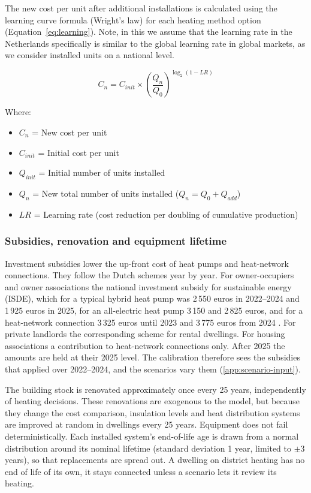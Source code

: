 \documentclass[preprint,12pt,authoryear]{elsarticle}
\begin{document}
The new cost per unit after additional installations is calculated using the
learning curve formula (Wright's law) for each heating method option
(Equation~\ref{eq:learning}). Note, in this we assume that the learning rate
in the Netherlands specifically is similar to the global learning rate in
global markets, as we consider installed units on a national level.

\begin{equation}\label{eq:learning}
  C_n = C_{init}\times \left(\frac{Q_n}{Q_0}\right)^{\log_2(1 - LR)}
\end{equation}

Where:
\begin{itemize}
  \item $C_n$ = New cost per unit
  \item $C_{init}$ = Initial cost per unit
  \item $Q_{init}$ = Initial number of units installed
  \item $Q_n$ = New total number of units installed ($Q_n = Q_0 + Q_{add}$)
  \item $LR$ = Learning rate (cost reduction per doubling of cumulative
  production)
\end{itemize}


\subsubsection{Subsidies, renovation and equipment lifetime}

Investment subsidies lower the up-front cost of heat pumps and heat-network
connections. They follow the Dutch schemes year by year. For owner-occupiers
and owner associations the national investment subsidy for sustainable energy
(ISDE), which for a typical hybrid heat pump was 2\,550 euros in 2022--2024
and 1\,925 euros in 2025, for an all-electric heat pump 3\,150 and 2\,825
euros, and for a heat-network connection 3\,325 euros until 2023 and 3\,775
euros from 2024 \citep{rvoISDE2025}. For private landlords the corresponding
scheme for rental dwellings. For housing associations a contribution to
heat-network connections only. After 2025 the amounts are held at their 2025
level. The calibration therefore sees the subsidies that applied over
2022--2024, and the scenarios vary them (\ref{app:scenario-input}).

The building stock is renovated approximately once every 25 years,
independently of heating decisions. These renovations are exogenous to the
model, but because they change the cost comparison, insulation levels and
heat distribution systems are improved at random in dwellings every 25 years.
Equipment does not fail deterministically. Each installed system's
end-of-life age is drawn from a normal distribution around its nominal
lifetime (standard deviation 1 year, limited to $\pm 3$ years), so that
replacements are spread out. A dwelling on district heating has no end of
life of its own, it stays connected unless a scenario lets it review its
heating.
\end{document}
